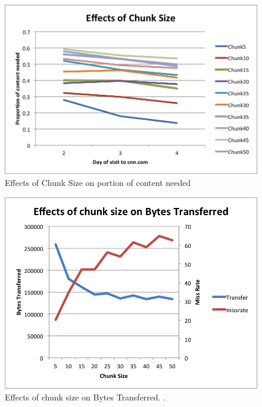 \begin{figure}[h] 
\centering \includegraphics[scale=0.40]{images/chunksize.png}
\caption{Effects of Chunk Size on portion of content needed}
\end{figure}

\begin{figure}[h] 
\centering \includegraphics[scale=0.40]{images/chunksize2.png}
\caption{Effects of chunk size on Bytes Transferred. .}
\end{figure}

